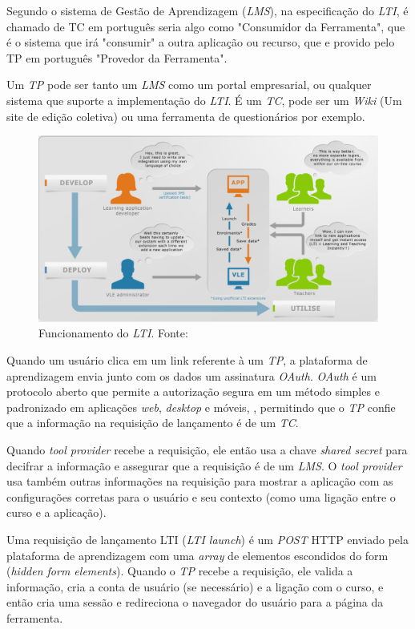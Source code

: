 \par
Segundo  o sistema de Gestão de Aprendizagem (\textit{LMS}), na especificação do \textit{LTI}, é chamado de \ac{TC} em português seria algo como "Consumidor da Ferramenta", que é o sistema que irá "consumir" a outra aplicação ou recurso, que e provido pelo \ac{TP} em português "Provedor da Ferramenta".
\par
Um \textit{TP} pode ser tanto um \textit{LMS} como um portal empresarial, ou qualquer sistema que suporte a implementação do \textit{LTI}. É um \textit{TC}, pode ser um \textit{Wiki} (Um site de edição coletiva) ou uma ferramenta de questionários por exemplo.
\begin{figure}[h]
    \centering
    \label{fig:ims-lti-funcionamento}
    \includegraphics[keepaspectratio=true,scale=0.5]{figuras/ims-lti-funcionamento.png}
    \caption{Funcionamento do \textit{LTI}. Fonte: }
\end{figure}
\par
Quando um usuário clica em um link referente à um \textit{TP}, a plataforma de aprendizagem envia junto com os dados um assinatura \textit{OAuth}. \textit{OAuth} é um protocolo aberto que permite a autorização segura em um método simples e padronizado em aplicações \textit{web}, \textit{desktop} e móveis, \cite{oauth}, permitindo que o \textit{TP} confie que a informação na requisição de lançamento é de um \textit{TC}.
\par
Quando \textit{tool provider} recebe a requisição, ele então usa a chave \textit{shared secret} para decifrar a informação e assegurar que a requisição é de um \textit{LMS}. O \textit{tool provider} usa também outras informações na requisição para mostrar a aplicação com as configurações corretas para o usuário e seu contexto (como uma ligação entre o curso e a aplicação).
\par
Uma requisição de lançamento LTI (\textit{LTI launch}) é um \textit{POST} \ac{HTTP} enviado pela plataforma de aprendizagem com uma \textit{array} de elementos escondidos do form (\textit{hidden form elements}). Quando o \textit{TP} recebe a requisição, ele valida a informação, cria a conta de usuário (se necessário) e a ligação com o curso, e então cria uma sessão e redireciona o navegador do usuário para a página da ferramenta.

